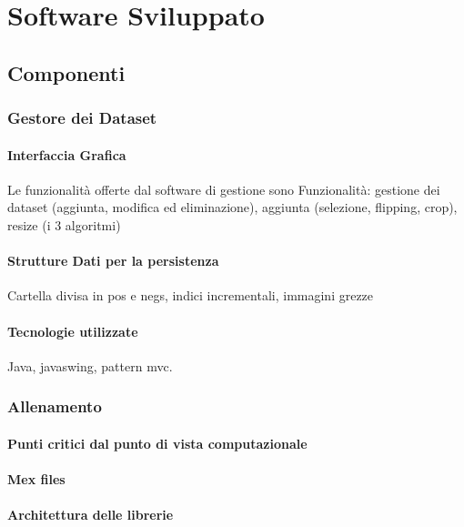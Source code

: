 
\chapter{Software Sviluppato}
\label{chap:software}


    \section{Componenti}
        \subsection{Gestore dei Dataset} %
        \label{sub:training_set_creator}
            \subsubsection{Interfaccia Grafica}
                Le funzionalità offerte dal software di gestione sono 
                Funzionalità: gestione dei dataset (aggiunta, modifica ed eliminazione), aggiunta (selezione, flipping, crop), resize (i 3 algoritmi)
            \subsubsection{Strutture Dati per la persistenza}
                Cartella divisa in pos e negs, indici incrementali, immagini grezze
            \subsubsection{Tecnologie utilizzate}        
                Java, javaswing, pattern mvc.
        
        \subsection{Allenamento}
            \subsubsection{Punti critici dal punto di vista computazionale}
            \subsubsection{Mex files}
            \subsubsection{Architettura delle librerie}
